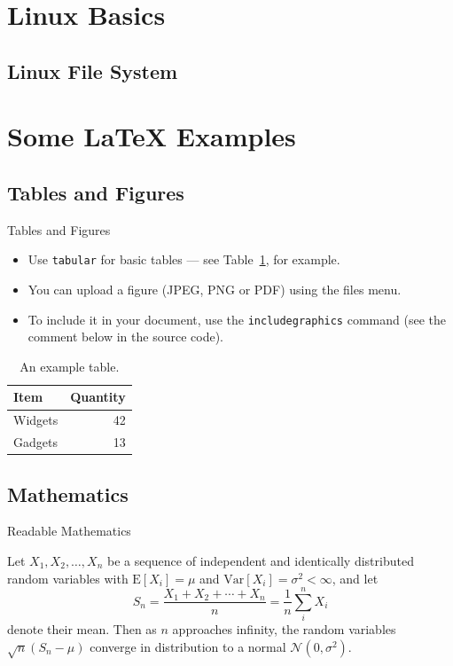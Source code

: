 \documentclass{beamer}
\begin{document}
\section{Linux Basics}
\subsection{Linux File System}


\section{Some \LaTeX{} Examples}

\subsection{Tables and Figures}

\begin{frame}{Tables and Figures}

\begin{itemize}
\item Use \texttt{tabular} for basic tables --- see Table~\ref{tab:widgets}, for example.
\item You can upload a figure (JPEG, PNG or PDF) using the files menu. 
\item To include it in your document, use the \texttt{includegraphics} command (see the comment below in the source code).
\end{itemize}


\begin{table}
\centering
\begin{tabular}{l|r}
Item & Quantity \\\hline
Widgets & 42 \\
Gadgets & 13
\end{tabular}
\caption{\label{tab:widgets}An example table.}
\end{table}

\end{frame}

\subsection{Mathematics}

\begin{frame}{Readable Mathematics}

Let $X_1, X_2, \ldots, X_n$ be a sequence of independent and identically distributed random variables with $\text{E}[X_i] = \mu$ and $\text{Var}[X_i] = \sigma^2 < \infty$, and let
$$S_n = \frac{X_1 + X_2 + \cdots + X_n}{n}
      = \frac{1}{n}\sum_{i}^{n} X_i$$
denote their mean. Then as $n$ approaches infinity, the random variables $\sqrt{n}(S_n - \mu)$ converge in distribution to a normal $\mathcal{N}(0, \sigma^2)$.

\end{frame}
\end{document}
